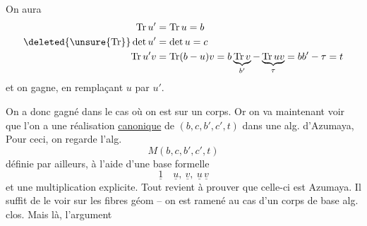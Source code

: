 On aura
\[
\begin{aligned}
\operatorname{Tr}u'&=\operatorname{Tr}u=b\\ \deleted{\unsure{\operatorname{Tr}}}\det u'&=\det u=c\\ \operatorname{Tr}u'v&=\operatorname{Tr}(b-u)v=b\underbrace{\operatorname{Tr}v}_{b'}-\underbrace{\operatorname{Tr}uv}_{\tau}=bb'-\tau=t
\end{aligned}
\]
et on gagne, en remplaçant $u$ par $u'$.

 On a donc gagné dans le cas où on est sur un corps. Or on va maintenant voir que l'on a une réalisation \uline{canonique} de  $(b,c,b',c',t)$ dans une alg. d'Azumaya, Pour ceci, on regarde l'alg.
\[
M(b,c,b',c',t)
\]
définie par ailleurs, à l'aide d'une base formelle
\[
\underline{1}\quad\underline{u},\ \underline{v},\ \underline{u}\,\underline{v}
\]
et une multiplication explicite. Tout revient à prouver que celle-ci est Azumaya. Il suffit de le voir sur les fibres géom -- on est ramené au cas d'un corps de base alg. clos. Mais là, l'argument
